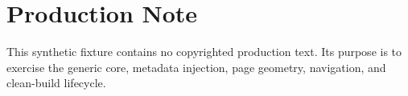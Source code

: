 \documentclass[10pt,twoside,openany]{book}
\begin{document}
\PSEBeginFrontMatter
\PSETitlePage
\PSEPublicationPage
\tableofcontents
\clearpage
\PSEBeginBody


\PSEBeginBackMatter
\chapter*{Production Note}
This synthetic fixture contains no copyrighted production text. Its purpose is to exercise the generic core, metadata injection, page geometry, navigation, and clean-build lifecycle.
\end{document}
